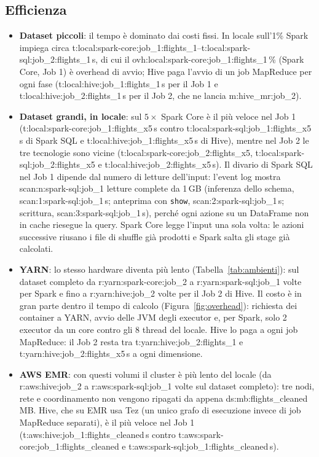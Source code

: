 \documentclass[11pt,a4paper]{article}
\newcommand{\T}[4]{\csname t:#1:#2:#3:#4\endcsname}
\newcommand{\OVH}[4]{\csname ovh:#1:#2:#3:#4\endcsname}
\newcommand{\DS}[2]{\csname ds:#1:#2\endcsname}
\newcommand{\M}[1]{\csname m:#1\endcsname}
\newcommand{\RY}[2]{\csname r:yarn:#1:#2\endcsname}
\newcommand{\RA}[2]{\csname r:aws:#1:#2\endcsname}
\newcommand{\SC}[3]{\csname scan:#1:#2:#3\endcsname}
\newcommand{\code}[1]{\texttt{#1}}
\begin{document}
\subsection{Efficienza}
\begin{itemize}
  \item \textbf{Dataset piccoli}: il tempo è dominato dai costi fissi. In locale sull'1\% Spark impiega circa
        \T{local}{spark-core}{job_1}{flights_1}--\T{local}{spark-sql}{job_2}{flights_1}\,s, di cui il
        \OVH{local}{spark-core}{job_1}{flights_1}\,\% (Spark Core, Job 1) è overhead di avvio; Hive paga l'avvio di un
        job MapReduce per ogni fase (\T{local}{hive}{job_1}{flights_1}\,s per il Job 1 e
        \T{local}{hive}{job_2}{flights_1}\,s per il Job 2, che ne lancia \M{hive_mr:job_2}).
  \item \textbf{Dataset grandi, in locale}: sul $5\times$ Spark Core è il più veloce nel Job 1
        (\T{local}{spark-core}{job_1}{flights_x5}\,s contro \T{local}{spark-sql}{job_1}{flights_x5}\,s di Spark SQL e
        \T{local}{hive}{job_1}{flights_x5}\,s di Hive), mentre nel Job 2 le tre tecnologie sono vicine
        (\T{local}{spark-core}{job_2}{flights_x5}, \T{local}{spark-sql}{job_2}{flights_x5} e
        \T{local}{hive}{job_2}{flights_x5}\,s). Il divario di Spark SQL nel Job 1 dipende dal numero di letture
        dell'input: l'event log mostra \SC{n}{spark-sql}{job_1} letture complete da 1\,GB (inferenza dello schema,
        \SC{1}{spark-sql}{job_1}\,s; anteprima con \code{show}, \SC{2}{spark-sql}{job_1}\,s; scrittura,
        \SC{3}{spark-sql}{job_1}\,s), perché ogni azione su un DataFrame non in cache riesegue la query. Spark Core
        legge l'input una sola volta: le azioni successive riusano i file di shuffle già
        prodotti e Spark salta gli stage già calcolati.
  \item \textbf{YARN}: lo stesso hardware diventa più lento (Tabella~\ref{tab:ambienti}): sul dataset completo da
        \RY{spark-core}{job_2} a \RY{spark-sql}{job_1} volte per Spark e fino a \RY{hive}{job_2} volte per il Job 2 di
        Hive. Il costo è in gran parte dentro il tempo di calcolo (Figura~\ref{fig:overhead}): richiesta dei container
        a YARN, avvio delle JVM degli executor e, per Spark, solo 2 executor da un core contro gli 8 thread del
        locale. Hive lo paga a ogni job MapReduce: il Job 2 resta tra \T{yarn}{hive}{job_2}{flights_1} e
        \T{yarn}{hive}{job_2}{flights_x5}\,s a ogni dimensione.
  \item \textbf{AWS EMR}: con questi volumi il cluster è più lento del locale (da \RA{hive}{job_2} a
        \RA{spark-sql}{job_1} volte sul dataset completo): tre nodi, rete e coordinamento non vengono ripagati da
        appena \DS{mb}{flights_cleaned}\,MB. Hive, che su EMR usa Tez (un unico grafo di esecuzione invece di job
        MapReduce separati), è il più veloce nel Job 1 (\T{aws}{hive}{job_1}{flights_cleaned}\,s contro
        \T{aws}{spark-core}{job_1}{flights_cleaned} e \T{aws}{spark-sql}{job_1}{flights_cleaned}\,s).
\end{itemize}
\end{document}
